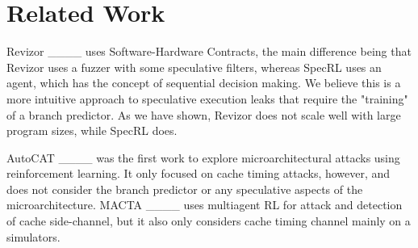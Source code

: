 \section{Related Work}
Revizor ____ uses Software-Hardware Contracts, the main difference being that Revizor uses a fuzzer with some speculative filters, whereas SpecRL uses an agent, which has the concept of sequential decision making. We believe this is a more intuitive approach to speculative execution leaks that require the "training" of a branch predictor. As we have shown, Revizor does not scale well with large program sizes, while SpecRL does.


AutoCAT ____ was the first work to explore microarchitectural attacks using reinforcement learning. It only focused on cache timing attacks, however, and does not consider the branch predictor or any speculative aspects of the microarchitecture. MACTA ____ uses multiagent RL for attack and detection of cache side-channel, but it also only considers cache timing channel mainly on a simulators.